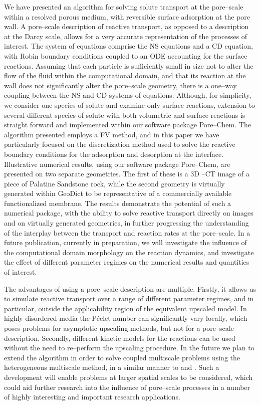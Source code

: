 \documentclass[preprint, 1p, authoryear]{elsarticle}
\begin{document}
We have presented an algorithm for solving    solute transport  at the pore--scale within a resolved porous medium, with reversible surface adsorption at the pore wall.   A pore--scale description of reactive transport, as opposed to a description at the Darcy scale,  allows for a very accurate representation of the processes of interest. 
The system of equations comprise the NS equations and  a CD equation, with Robin boundary conditions coupled to an ODE accounting for the surface reactions.  Assuming that  each particle is sufficiently small in size not to alter the flow of the fluid within the computational domain, and that its reaction at the wall does not significantly alter the pore--scale geometry, there is  a one--way coupling between the NS and CD systems of equations.   Although, for simplicity, we  consider one species of solute and  examine only surface reactions, extension to several different species of solute with both volumetric and surface reactions is straight forward and implemented within our software package Pore--Chem.  
 The algorithm presented employs a FV method,  and in this paper we have particularly focused on the discretization method used to solve the reactive  boundary conditions for the adsorption and desorption at the interface. 
 Illustrative numerical results, using our software package Pore--Chem, are presented on two separate geometries. The first of these  is a 3D --CT image of a piece of Palatine Sandstone rock, while the second geometry is virtually generated within GeoDict \citep{Geodict} to be representative of a commercially available functionalized membrane.   The results demonstrate the potential of such a numerical package, with the ability to solve reactive transport directly on images and on virtually generated geometries, in further progressing the understanding of the interplay between the transport and reaction rates at the pore--scale.  In a future publication, currently in preparation, we will investigate the influence of the computational domain morphology on the reaction dynamics, and investigate the effect of different parameter regimes on the numerical results and quantities of interest. 

The advantages of using a pore--scale description are multiple. Firstly, it allows us to simulate reactive transport over a range of different parameter regimes, and in particular, outside the applicability region of the equivalent upscaled model. In  highly disordered media the P\'eclet number can significantly vary locally, which poses problems for asymptotic upscaling methods, but not for a pore--scale description.   Secondly, different kinetic models for the reactions can be used without the need to re--perform the upscaling procedure.    In the future we plan to extend the algorithm in order to solve coupled multiscale problems using the heterogeneous multiscale method, in a similar manner to   \citet{Battiato2011Hybrid} and \citet{Iliev2014Multiscale}.  Such a development will enable problems at larger spatial scales to be considered, which could aid further research into the influence of pore--scale processes in a number of highly interesting and important research applications. 







\end{document}
